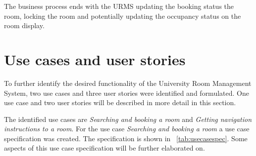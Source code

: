 \documentclass[conference,onecolumn]{IEEEtran}
\begin{document}
The business process ends with the URMS updating the booking status the room, locking the room and potentially updating the occupancy status on the room display.

\section{Use cases and user stories}

To further identify the desired functionality of the University Room Management System, two use cases and three user stories were identified and formulated.
One use case and two user stories will be described in more detail in this section.

The identified use cases are \emph{Searching and booking a room} and \emph{Getting navigation instructions to a room}.
For the use case \emph{Searching and booking a room} a use case specification was created. The specification is shown in \tablename~\ref{tab:usecasespec}. Some aspects of this use case specification will be further elaborated on.
\end{document}
